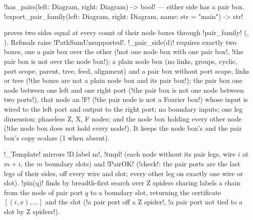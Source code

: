 {\begin{signature}
\py!has_pairs(left: Diagram, right: Diagram) -> bool! --- either side has a pair box.\\
\py!export_pair_family(left: Diagram, right: Diagram, name: str = "main") -> str!
\end{signature}
\noindent proves two sides equal at every count of their node boxes through \lean!pair_family!
(, ). Refusals raise \py!PathSumUnsupported!.
\py!_pair_side(d)! requires exactly two boxes, one a pair box over the other
(\code!not one node box with one pair box!, \code!the pair box is not over the node box!); a
plain node box (no links, groups, cyclic, port scope, parent, tree, feed, alignment) and a pair
box without port scope, links or tree
(\code!the boxes are not a plain node box and its pair box!); the pair box one node between one
left and one right port (\code!the pair box is not one node between two ports!), that node an
\code!F! (\code!the pair node is not a Fourier box!) whose input is wired to the left port and
output to the right port; no boundary inputs; one leg dimension; phaseless Z, X, F nodes; and the
node box holding every other node (\code!the node box does not hold every node!). It keeps the
node box's and the pair box's copy scalars (1 when absent).

\py!_Template! mirrors \lean!D.label m!, \lean!tmpl! (each node without its pair legs, wire $i$ at
$m+i$, the $m$ boundary slots) and \lean!PairOK! (\py!check!: the pair ports are the last legs of
their sides, off every wire and slot; every other leg on exactly one wire or slot).
\py!pin(q)! finds by breadth-first search over Z spiders sharing labels a chain from the node of
pair port $q$ to a boundary slot, returning the certificate $[(i, x), \dots]$ and the slot
(\code!a pair port off a Z spider!, \code!a pair port not tied to a slot by Z spiders!).

}
